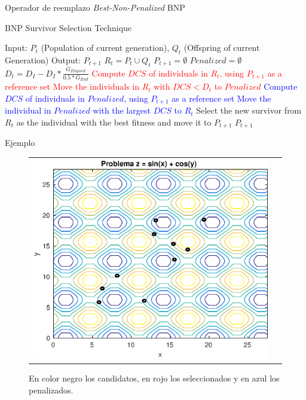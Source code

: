 \documentclass{beamer}
\begin{document}
\begin{frame}{Operador de reemplazo \textit{Best-Non-Penalized} BNP}
\begin{algorithm}[H]
\caption{BNP Survivor Selection Technique} 
\begin{scriptsize}
\begin{algorithmic}
\STATE Input: $P_t$ (Population of current generation), $Q_t$ (Offspring of current Generation)
   	\STATE Output: $P_{t+1}$ 
        \STATE $R_t = P_t \cup Q_t$ 
        \STATE $P_{t+1} = \emptyset$ 
        \STATE $Penalized = \emptyset$ 
				\STATE $D_t = D_I - D_I * \frac{G_{Elapsed}}{0.5*G_{End}}$
         \label{alg:6}
					\STATE \textcolor{red}{Compute $DCS$ of individuals in $R_t$, using $P_{t+1}$ as a reference set}
					\STATE \textcolor{red}{Move the individuals in $R_t$ with $DCS < D_t$ to $Penalized$}
        	 \label{alg:9}
						\STATE \textcolor{blue}{ Compute $DCS$ of individuals in $Penalized$, using $P_{t+1}$ as a reference set}
						\STATE \textcolor{blue}{Move the individual in $Penalized$ with the largest $DCS$ to $R_t$}
        	\ENDIF
					\STATE Select the new survivor from $R_t$ as the individual with the best fitness  and move it to $P_{t+1}$
        \ENDWHILE
    	\RETURN $P_{t+1}$ \label{alg:14}
\end{algorithmic}
\end{scriptsize}
\end{algorithm}
\end{frame}



\begin{frame}{Ejemplo}
\begin{figure}[H]
  \centering
  \begin{tabular}{c c}
   \includegraphics[scale=0.6]{Images/1.eps} 
  \end{tabular}
  \caption{\scriptsize En color negro los candidatos, en rojo los seleccionados y en azul los penalizados.}
\end{figure}
\end{frame}
\end{document}
